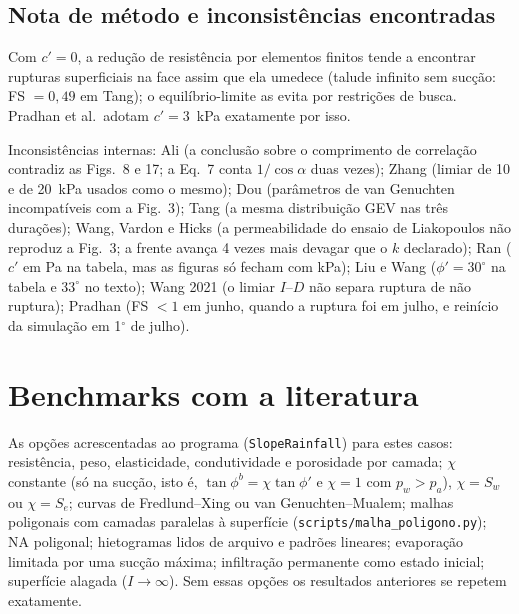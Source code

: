 \subsection{Nota de m\'etodo e inconsist\^encias encontradas}

Com $c'=0$, a redu\c{c}\~ao de resist\^encia por elementos finitos tende a encontrar rupturas superficiais na face assim
que ela umedece (talude infinito sem suc\c{c}\~ao: FS $=0{,}49$ em Tang); o equil\'ibrio-limite as evita por
restri\c{c}\~oes de busca. Pradhan et al.\ adotam $c'=3$~kPa exatamente por isso.

Inconsist\^encias internas: Ali (a conclus\~ao sobre o comprimento de correla\c{c}\~ao contradiz as Figs.~8 e 17; a
Eq.~7 conta $1/\cos\alpha$ duas vezes); Zhang (limiar de 10 e de 20~kPa usados como o mesmo); Dou (par\^ametros de van
Genuchten incompat\'iveis com a Fig.~3); Tang (a mesma distribui\c{c}\~ao GEV nas tr\^es dura\c{c}\~oes); Wang, Vardon e
Hicks (a permeabilidade do ensaio de Liakopoulos n\~ao reproduz a Fig.~3; a frente avan\c{c}a 4 vezes mais devagar que
o $k$ declarado); Ran ($c'$ em Pa na tabela, mas as figuras s\'o fecham com kPa); Liu e Wang ($\phi'=30^\circ$ na tabela e
$33^\circ$ no texto); Wang 2021 (o limiar $I$--$D$ n\~ao separa ruptura de n\~ao ruptura); Pradhan (FS $<1$ em junho,
quando a ruptura foi em julho, e rein\'icio da simula\c{c}\~ao em 1$^\circ$ de julho).

\section{Benchmarks com a literatura}\label{sec:benchmarks}

As op\c{c}\~oes acrescentadas ao programa (\texttt{SlopeRainfall}) para estes casos: resist\^encia, peso,
elasticidade, condutividade e porosidade por camada; $\chi$ constante (s\'o na suc\c{c}\~ao, isto \'e,
$\tan\phi^b=\chi\tan\phi'$ e $\chi=1$ com $p_w>p_a$), $\chi=S_w$ ou $\chi=S_e$; curvas de Fredlund--Xing ou van
Genuchten--Mualem; malhas poligonais com camadas paralelas \`a superf\'icie (\texttt{scripts/malha\_poligono.py}); NA
poligonal; hietogramas lidos de arquivo e padr\~oes lineares; evapora\c{c}\~ao limitada por uma suc\c{c}\~ao m\'axima;
infiltra\c{c}\~ao permanente como estado inicial; superf\'icie alagada ($I\to\infty$). Sem essas op\c{c}\~oes os
resultados anteriores se repetem exatamente.

